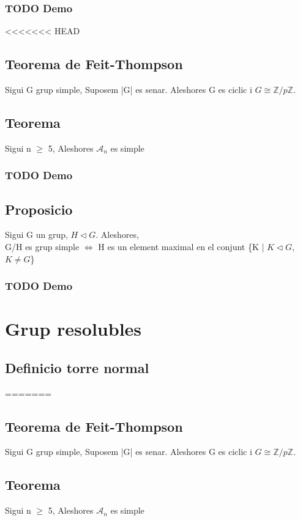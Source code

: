 \documentclass[11pt]{article}
\begin{document}
\subsubsection{{\bfseries\sffamily TODO} Demo}
<<<<<<< HEAD
\label{sec:org87db5f7}
\subsection{Teorema de Feit-Thompson}
\label{sec:orgd59edd5}
Sigui G grup simple, Suposem |G| es senar. Aleshores G es ciclic i \(G \cong \mathbb{Z}/p\mathbb{Z}\).
\subsection{Teorema}
\label{sec:org329026a}
Sigui n \(\geq\) 5, Aleshores \(\mathcal{A}_n\) es simple
\subsubsection{{\bfseries\sffamily TODO} Demo}
\label{sec:org1e5f02d}
\subsection{Proposicio}
\label{sec:orge5adb38}
    Sigui G un grup, \(H \vartriangleleft G\). Aleshores,\\
G/H es grup simple \(\iff\) H es un element maximal en el conjunt \{K | \(K \vartriangleleft G\), \(K \neq G\)\}
\subsubsection{{\bfseries\sffamily TODO} Demo}
\label{sec:org59c66d6}

\section{Grup resolubles}
\label{sec:orge5c1f3f}

\subsection{Definicio torre normal}
\label{sec:org6d78fca}
=======
\label{sec:org2a59ea0}
\subsection{Teorema de Feit-Thompson}
\label{sec:orgf9a3437}
Sigui G grup simple, Suposem |G| es senar. Aleshores G es ciclic i \(G \cong \mathbb{Z}/p\mathbb{Z}\).
\subsection{Teorema}
\label{sec:org6574a0c}
Sigui n \(\geq\) 5, Aleshores \(\mathcal{A}_n\) es simple
\end{document}
